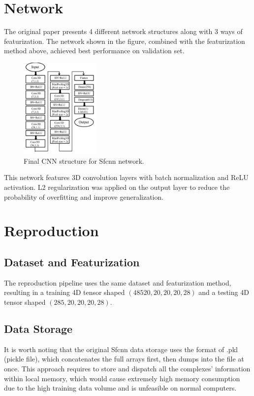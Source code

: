 \documentclass[unnumsec,webpdf,contemporary,large]{oup-authoring-template}
\theoremstyle{thmstyleone}%
\theoremstyle{thmstyletwo}%
\theoremstyle{thmstylethree}%
\begin{document}
\section{Network}

The original paper presents 4 different network structures along with 3 ways of featurization. The network shown in the figure, combined with the featurization method above, achieved best performance on validation set.

\begin{figure}[!t]
    \centering
    \includegraphics[width=0.35\textwidth]{images/CNN.png}
    \caption{Final CNN structure for Sfcnn network.}
    \label{fig:CNN}
\end{figure}

This network features 3D convolution layers with batch normalization and ReLU activation. L2 regularization was applied on the output layer to reduce the probability of overfitting and improve generalization.

\section{Reproduction}

\subsection{Dataset and Featurization}
The reproduction pipeline uses the same dataset and featurization method, resulting in a training 4D tensor shaped $(48520, 20, 20, 20, 28)$ and a testing 4D tensor shaped $(285, 20, 20, 20, 28)$.

\subsection{Data Storage}
It is worth noting that the original Sfcnn data storage uses the format of .pkl (pickle file), which concatenates the full arrays first, then dumps into the file at once. This approach requires to store and dispatch all the complexes' information within local memory, which would cause extremely high memory consumption due to the high training data volume and is unfeasible on normal computers.
\end{document}
